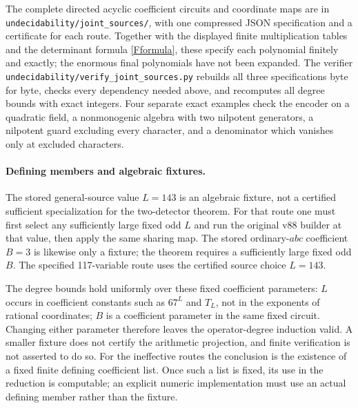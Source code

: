 \documentclass[11pt]{article}
\begin{document}
The complete directed acyclic coefficient circuits and coordinate maps are
in \nolinkurl{undecidability/joint_sources/}, with one compressed JSON
specification and a certificate for each route. Together with the displayed
finite multiplication tables and the determinant formula \eqref{Fformula},
these specify each polynomial finitely and exactly; the enormous final
polynomials have not been expanded. The verifier
\nolinkurl{undecidability/verify_joint_sources.py} rebuilds all three
specifications byte for byte, checks every dependency needed above, and
recomputes all degree bounds with exact integers. Four separate exact
examples check the encoder on a quadratic field, a nonmonogenic algebra
with two nilpotent generators, a nilpotent guard excluding every character,
and a denominator which vanishes only at excluded characters.

\paragraph{Defining members and algebraic fixtures.}
The stored general-source value $L=143$ is an algebraic fixture, not a
certified sufficient specialization for the two-detector theorem. For that
route one must first select any sufficiently large fixed odd $L$ and run
the original v88 builder at that value, then apply the same sharing map.
The stored ordinary-$abc$ coefficient $B=3$ is likewise only a fixture;
the theorem requires a sufficiently large fixed odd $B$. The specified
117-variable route uses the certified source choice $L=143$.

The degree bounds hold uniformly over these fixed coefficient parameters:
$L$ occurs in coefficient constants such as $67^L$ and $T_L$, not in the
exponents of rational coordinates; $B$ is a coefficient parameter in the
same fixed circuit. Changing either parameter therefore leaves the
operator-degree induction valid. A smaller fixture does not certify the
arithmetic projection, and finite verification is not asserted to do so.
For the ineffective routes the conclusion is the existence of a fixed
finite defining coefficient list. Once such a list is fixed, its use in
the reduction is computable; an explicit numeric implementation must use
an actual defining member rather than the fixture.
\end{document}
